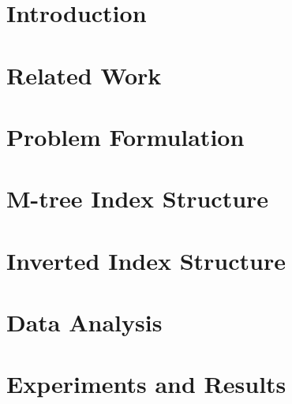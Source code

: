 \documentclass[MTech]{iitmdiss}
\begin{document}

\begin{singlespace}
\tableofcontents
\thispagestyle{empty}

\listoftables
{}
\listoffigures
{}
\end{singlespace}

\pagebreak


%
%
%
\chapter{Introduction}


\chapter{Related Work}


\chapter{Problem Formulation}




\chapter{M-tree Index Structure}


\chapter{Inverted Index Structure}


\chapter{Data Analysis}


\chapter{Experiments and Results}

\end{document}
